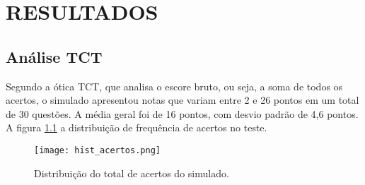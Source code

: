 \chapter{RESULTADOS}

\section{Análise TCT}

Segundo a ótica TCT, que analisa o escore bruto, ou seja, a soma de todos os acertos, o simulado apresentou notas que variam entre 2 e 26 pontos em um total de 30 questões. A média geral foi de 16 pontos, com desvio padrão de 4,6 pontos. A figura \ref{fig:hist_acertos} a distribuição de frequência de acertos no teste.

\begin{figure}[H]
	\centering
	\texttt{[image: hist\_acertos.png]}
	\caption{Distribuição do total de acertos do simulado.}
	\label{fig:hist_acertos}
\end{figure}


